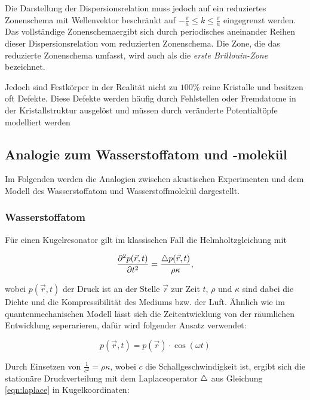 Die Darstellung der Dispersionsrelation muss jedoch auf ein reduziertes Zonenschema mit Wellenvektor beschränkt auf $- \frac{\pi}{a} \leq k \leq \frac{\pi}{a}$ eingegrenzt werden. Das vollständige Zonenschemaergibt sich durch periodisches aneinander Reihen dieser Dispersionsrelation vom reduzierten Zonenschema. Die Zone, die das reduzierte Zonenschema umfasst, wird auch als die \textit{erste Brillouin-Zone} bezeichnet.  

Jedoch sind Festkörper in der Realität nicht zu $100 \%$ reine Kristalle und besitzen oft Defekte. Diese Defekte werden häufig durch Fehlstellen oder Fremdatome in der Kristallstruktur ausgelöst und müssen durch veränderte Potentialtöpfe modelliert werden

\subsection{Analogie zum Wasserstoffatom und -molekül}
\label{sec:analogien}

Im Folgenden werden die Analogien zwischen akustischen Experimenten und dem Modell des Wasserstoffatom und Wasserstoffmolekül dargestellt. 

\subsubsection{Wasserstoffatom}
\label{sec:ana-H}

Für einen Kugelresonator gilt im klassischen Fall die Helmholtzgleichung mit

\begin{equation}
    \frac{\partial^2 p(\vec{r}, t)}{\partial t^2} = \frac{\mathop{}\!\mathbin\bigtriangleup p(\vec{r}, t)}{\rho \kappa} ,
    \label{eqn:helmholtz}
\end{equation}

wobei $p(\vec{r}, t)$ der Druck ist an der Stelle $\vec{r}$ zur Zeit $t$, $\rho$ und $\kappa$ sind dabei die Dichte und die Kompressibilität des Mediums bzw. der Luft. Ähnlich wie im quantenmechanischen Modell lässt sich die Zeitentwicklung von der räumlichen Entwicklung seperarieren, dafür wird folgender Ansatz verwendet:

\begin{equation}
    p(\vec{r}, t) = p(\vec{r}) \cdot \cos(\omega t)
    \label{eqn:akus_sep}
\end{equation}

Durch Einsetzen von $\frac{1}{c^2} = \rho \kappa$, wobei $c$ die Schallgeschwindigkeit ist, ergibt sich die stationäre Druckverteilung mit dem Laplaceoperator $\mathop{}\!\mathbin\bigtriangleup$ aus Gleichung \eqref{eqn:laplace} in Kugelkoordinaten:

